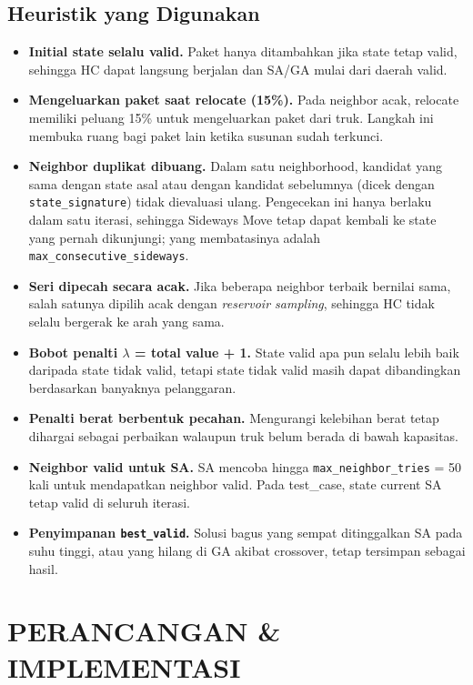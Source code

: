 \documentclass[12pt,a4paper]{report}
\newcommand{\code}[1]{\texttt{\small #1}}
\begin{document}
\section{Heuristik yang Digunakan}
\begin{itemize}[leftmargin=1.5cm]
  \item \textbf{Initial state selalu valid.} Paket hanya ditambahkan jika state tetap valid, sehingga
        HC dapat langsung berjalan dan SA/GA mulai dari daerah valid.
  \item \textbf{Mengeluarkan paket saat relocate (15\%).} Pada neighbor acak, relocate memiliki
        peluang 15\% untuk mengeluarkan paket dari truk. Langkah ini membuka ruang bagi paket lain
        ketika susunan sudah terkunci.
  \item \textbf{Neighbor duplikat dibuang.} Dalam satu neighborhood, kandidat yang sama dengan state
        asal atau dengan kandidat sebelumnya (dicek dengan \code{state\_signature}) tidak dievaluasi
        ulang. Pengecekan ini hanya berlaku dalam satu iterasi, sehingga Sideways Move tetap dapat
        kembali ke state yang pernah dikunjungi; yang membatasinya adalah
        \code{max\_consecutive\_sideways}.
  \item \textbf{Seri dipecah secara acak.} Jika beberapa neighbor terbaik bernilai sama, salah satunya
        dipilih acak dengan \textit{reservoir sampling}, sehingga HC tidak selalu bergerak ke arah
        yang sama.
  \item \textbf{Bobot penalti $\lambda$ = total value + 1.} State valid apa pun selalu lebih baik
        daripada state tidak valid, tetapi state tidak valid masih dapat dibandingkan berdasarkan
        banyaknya pelanggaran.
  \item \textbf{Penalti berat berbentuk pecahan.} Mengurangi kelebihan berat tetap dihargai sebagai
        perbaikan walaupun truk belum berada di bawah kapasitas.
  \item \textbf{Neighbor valid untuk SA.} SA mencoba hingga \code{max\_neighbor\_tries} = 50 kali untuk
        mendapatkan neighbor valid. Pada test\_case, state current SA tetap valid di seluruh iterasi.
  \item \textbf{Penyimpanan \code{best\_valid}.} Solusi bagus yang sempat ditinggalkan SA pada suhu
        tinggi, atau yang hilang di GA akibat crossover, tetap tersimpan sebagai hasil.
\end{itemize}

\chapter{PERANCANGAN \& IMPLEMENTASI}
\end{document}
